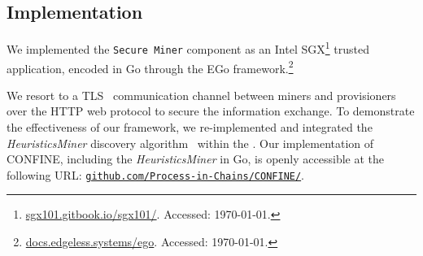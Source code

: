 \subsection{Implementation}
\label{sec:implementation:details}
We implemented the \texttt{Secure Miner} component as an Intel SGX\footnote{\url{sgx101.gitbook.io/sgx101/}. Accessed: \today.} trusted application, encoded in Go through the EGo framework.\footnote{\url{docs.edgeless.systems/ego}. Accessed: \today.} 

We resort to a TLS~\citep{Thomas/2000:SSL-TLS} communication channel between miners and provisioners over the HTTP web protocol to secure the information exchange. To demonstrate the effectiveness of our framework, 
we re-implemented and integrated the \textit{HeuristicsMiner} discovery algorithm~\citep{weijters2006process} within the . %
Our implementation of CONFINE, including the \textit{HeuristicsMiner} in Go, is openly accessible at the following URL: \href{https://github.com/Process-in-Chains/CONFINE/}{\nolinkurl{github.com/Process-in-Chains/CONFINE/}}.
